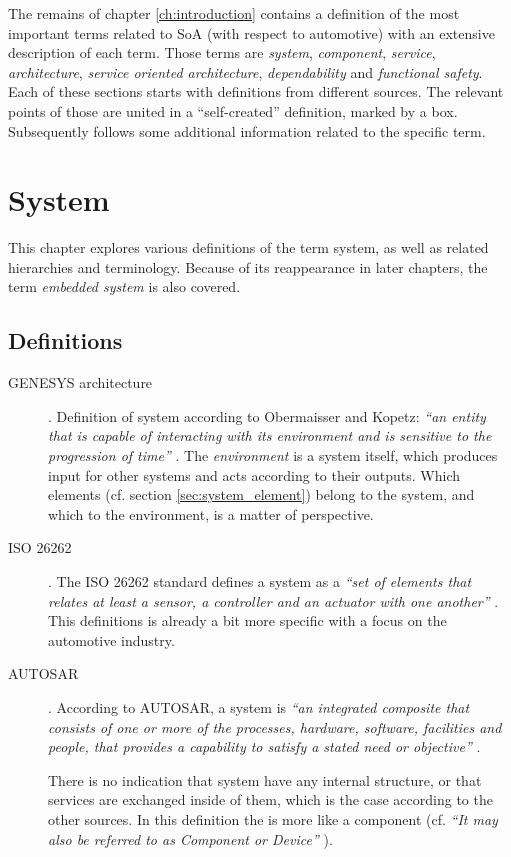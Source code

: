 The remains of chapter \ref{ch:introduction} contains a definition of the most important terms related to SoA (with respect to automotive) with an extensive description of each term. Those terms are \emph{system}, \emph{component}, \emph{service}, \emph{architecture}, \emph{service oriented architecture}, \emph{dependability} and \emph{functional safety}. Each of these sections starts with definitions from different sources. The relevant points of those are united in a ``self-created'' definition, marked by a box. Subsequently follows some additional information related to the specific term.



\section{System}

\label{ch:system}
This chapter explores various definitions of the term system, as well as related hierarchies and terminology. Because of its reappearance in later chapters, the term \emph{embedded system} is also covered.

\subsection{Definitions}

\begin{description}

\item [GENESYS architecture].
Definition of system according to Obermaisser and Kopetz: \emph{``an entity that is capable of interacting with its environment and is sensitive to the progression of time''} \cite[p.7]{genesys}.
The \emph{environment} is a system itself, which produces input for other systems and acts according to their outputs. Which elements (cf. section \ref{sec:system_element}) belong to the system, and which to the environment, is a matter of perspective. 

\item [ISO 26262].
The ISO 26262 standard defines a system as a \emph{``set of elements that relates at least a sensor, a controller and an actuator with one another''} \cite{iso26262:1}. This definitions is already a bit more specific with a focus on the automotive industry.

\item [AUTOSAR].
According to AUTOSAR, a system is \emph{``an integrated composite that consists of one or more of the processes, hardware, software, facilities and people, that provides a capability to satisfy a stated need or objective''} \cite{autosar_glossary}.

There is no indication that system have any internal structure, or that services are exchanged inside of them, which is the case according to the other sources. In this definition the is more like a component (cf. \emph{``It may also be referred to as Component or Device''} \cite{arrowhead_inpr}).
\end{description}


